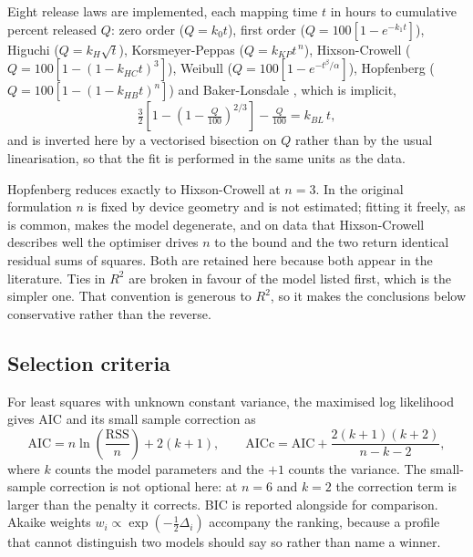 \documentclass[11pt,a4paper]{article}
\begin{document}
Eight release laws are implemented, each mapping time $t$ in hours to
cumulative percent released $Q$: zero order ($Q=k_0t$), first order
($Q=100[1-e^{-k_1t}]$), Higuchi \cite{higuchi1961,higuchi1963}
($Q=k_H\sqrt{t}$), Korsmeyer-Peppas \cite{korsmeyer1983}
($Q=k_{KP}t^{\,n}$), Hixson-Crowell \cite{hixson1931}
($Q=100[1-(1-k_{HC}t)^3]$), Weibull \cite{langenbucher1972}
($Q=100[1-e^{-t^{\beta}/\alpha}]$), Hopfenberg \cite{hopfenberg1976}
($Q=100[1-(1-k_{HB}t)^{n}]$) and Baker-Lonsdale \cite{baker1974}, which is
implicit,
\begin{equation}
\tfrac{3}{2}\left[1-\left(1-\tfrac{Q}{100}\right)^{2/3}\right]-\tfrac{Q}{100}
= k_{BL}\,t ,
\end{equation}
and is inverted here by a vectorised bisection on $Q$ rather than by the usual
linearisation, so that the fit is performed in the same units as the data.

Hopfenberg reduces exactly to Hixson-Crowell at $n=3$. In the original
formulation $n$ is fixed by device geometry and is not estimated; fitting it
freely, as is common, makes the model degenerate, and on data that
Hixson-Crowell describes well the optimiser drives $n$ to the bound and the
two return identical residual sums of squares. Both are retained here because
both appear in the literature. Ties in $R^2$ are broken in favour of the
model listed first, which is the simpler one. That convention is generous to
$R^2$, so it makes the conclusions below conservative rather than the reverse.

\subsection{Selection criteria}

For least squares with unknown constant variance, the maximised log likelihood
gives AIC \cite{akaike1974} and its small sample correction
\cite{hurvich1989} as
\begin{equation}
\mathrm{AIC} = n\ln\!\left(\frac{\mathrm{RSS}}{n}\right) + 2(k+1),
\qquad
\mathrm{AICc} = \mathrm{AIC} + \frac{2(k+1)(k+2)}{n-k-2},
\end{equation}
where $k$ counts the model parameters and the $+1$ counts the variance. The
small-sample correction is not optional here: at $n=6$ and $k=2$ the
correction term is larger than the penalty it corrects. BIC \cite{schwarz1978} is reported alongside for comparison. Akaike weights
$w_i \propto \exp(-\tfrac{1}{2}\Delta_i)$ \cite{burnham2002} accompany the
ranking, because a profile that cannot distinguish two models should say so
rather than name a winner.
\end{document}
